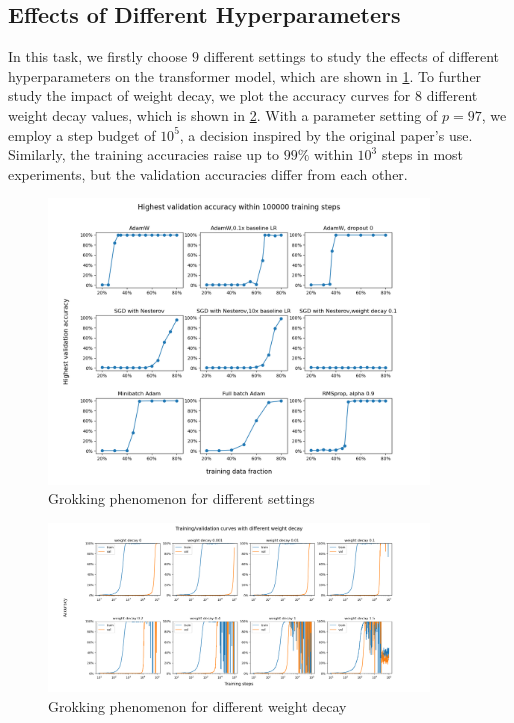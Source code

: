 \subsection{Effects of Different Hyperparameters}
\label{sec:subtask3}

In this task, we firstly choose $9$ different settings to study the effects of different hyperparameters on the transformer model, which are shown in \cref{fig:different_settings}.
To further study the impact of weight decay, we plot the accuracy curves for $8$ different weight decay values, which is shown in \cref{fig:different weight_decay}.
With a parameter setting of $p=97$, we employ a step budget of $10^5$, a decision inspired by the original paper's use. 
Similarly, the training accuracies raise up to $99\%$ within $10^3$ steps in most experiments, but the validation accuracies differ from each other.

\begin{figure}[!ht]
    \centering
    \includegraphics[width=0.9\textwidth]{fig/different_settings/different_settings.png}
    \caption{Grokking phenomenon for different settings}
    \label{fig:different_settings}
\end{figure}
\begin{figure}[!ht]
    \centering
    \includegraphics[width=0.9\textwidth]{fig/weight_decay/weight_decay.png}
    \caption{Grokking phenomenon for different weight decay}
    \label{fig:different weight_decay}
\end{figure}

